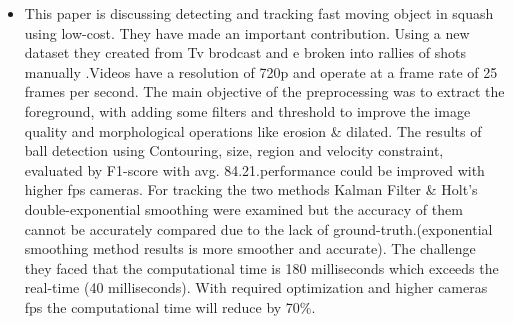\documentclass[12pt]{article}
\begin{document}
    \begin{itemize}
        \item This paper \cite{squashLowCost} is discussing detecting and tracking fast moving object in squash using low-cost. They have made an important contribution. Using a new dataset they created from Tv brodcast and e broken into rallies of shots manually .Videos have a resolution of 720p and operate at a frame rate of 25 frames per second. The main objective of the preprocessing was to extract the foreground, with adding some filters and threshold to improve the image quality and morphological operations like erosion \& dilated. The results of ball detection using  Contouring, size, region and velocity constraint, evaluated by F1-score with avg. 84.21.performance could be improved with higher fps cameras. For tracking the two methods Kalman Filter \& Holt’s double-exponential smoothing were examined but the accuracy of them cannot be accurately compared due to the lack of ground-truth.(exponential smoothing method results is more smoother and accurate). The challenge they faced that the computational time is 180 milliseconds which exceeds the real-time (40 milliseconds). With required optimization and higher cameras fps the computational time will reduce by 70\%.
     

\end{itemize}
\end{document}
